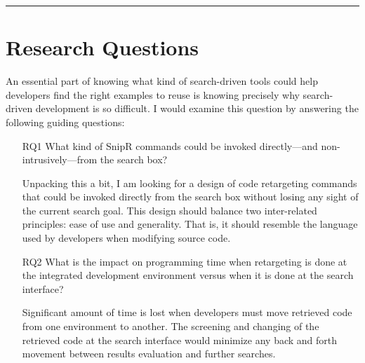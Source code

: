 \fancybreak{\pfbreakdisplay}

\section{Research Questions}
\label{sec:questions}

An essential part of knowing what kind of search-driven tools could help developers find the right examples to reuse is knowing precisely why search-driven development is so difficult. I would examine this question by answering the following guiding questions: 

\begin{itemize}
	
	\item[RQ1] What kind of SnipR commands could be invoked directly---and 
	non-intrusively---from the search box? 
	
	Unpacking this a bit, I am looking for a design of code retargeting commands that 
	could be invoked directly from the search box without losing any sight of the current 
	search goal. This design should balance two inter-related principles: ease of use and 
	generality. That is, it should resemble the language used by developers when 
	modifying source code.
	
	\item[RQ2] What is the impact on programming time when retargeting is done at the 
	integrated development environment versus when it is done at the search interface?  
	
	Significant amount of time is lost when developers must move retrieved code from one 
	environment to another. The screening and changing of the retrieved code at the 
	search interface would minimize any back and forth movement between results 
	evaluation and further searches.
	

\end{itemize}

